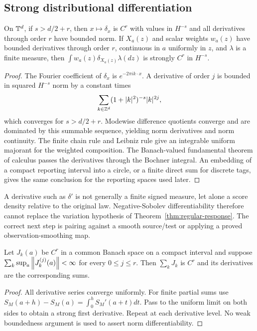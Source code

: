 \subsection{Strong distributional differentiation}
\begin{lemma}\label{lem:dirac}
On $\mathbb T^d$, if $s>d/2+r$, then $x\mapsto\delta_x$ is $C^r$ with values in $H^{-s}$ and all derivatives through order $r$ have bounded norm. If $X_a(z)$ and scalar weights $w_a(z)$ have bounded derivatives through order $r$, continuous in $a$ uniformly in $z$, and $\lambda$ is a finite measure, then
$\int w_a(z)\delta_{X_a(z)}\lambda(dz)$ is strongly $C^r$ in $H^{-s}$.
\end{lemma}
\begin{proof}
The Fourier coefficient of $\delta_x$ is $e^{-2\pi ik\cdot x}$. A derivative of order $j$ is bounded in squared $H^{-s}$ norm by a constant times
\[
 \sum_{k\in\mathbb Z^d}(1+|k|^2)^{-s}|k|^{2j},
\]
which converges for $s>d/2+r$. Modewise difference quotients converge and are dominated by this summable sequence, yielding norm derivatives and norm continuity. The finite chain rule and Leibniz rule give an integrable uniform majorant for the weighted composition. The Banach-valued fundamental theorem of calculus passes the derivatives through the Bochner integral. An embedding of a compact reporting interval into a circle, or a finite direct sum for discrete tags, gives the same conclusion for the reporting spaces used later.
\end{proof}

A derivative such as $\delta'$ is not generally a finite signed measure, let alone a score density relative to the original law. Negative-Sobolev differentiability therefore cannot replace the variation hypothesis of Theorem~\ref{thm:regular-response}. The correct next step is pairing against a smooth source/test or applying a proved observation-smoothing map.

\begin{lemma}\label{lem:sum}
Let $J_k(a)$ be $C^r$ in a common Banach space on a compact interval and suppose
$\sum_k\sup_a\left\lVert J_k^{(j)}(a)\right\rVert<\infty$ for every $0\le j\le r$. Then $\sum_kJ_k$ is $C^r$ and its derivatives are the corresponding sums.
\end{lemma}
\begin{proof}
All derivative series converge uniformly. For finite partial sums use
$S_M(a+h)-S_M(a)=\int_0^hS_M'(a+t)dt$. Pass to the uniform limit on both sides to obtain a strong first derivative. Repeat at each derivative level. No weak boundedness argument is used to assert norm differentiability.
\end{proof}
\par
